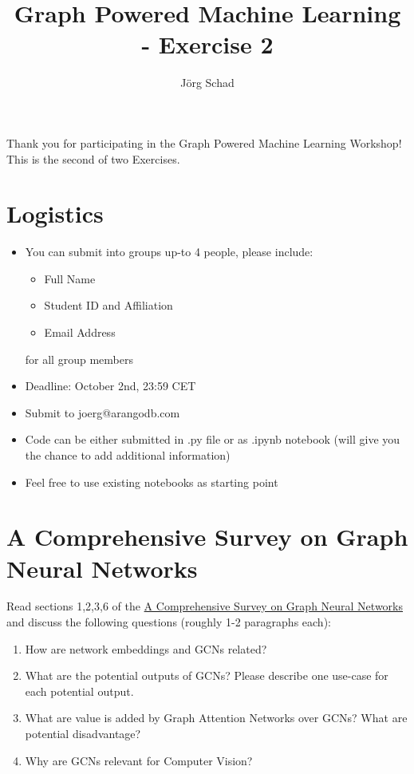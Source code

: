 \documentclass[12pt,a4paper]{article}
\title{Graph Powered Machine Learning - Exercise 2}
\author{J{\"o}rg Schad}
\begin{document}
\maketitle

Thank you for participating in the Graph Powered Machine Learning Workshop! This is the second of two Exercises.

\section*{Logistics}

\begin{itemize}
  \item You can submit into groups up-to 4 people, please include: 
  \begin{itemize}
  \item Full Name
  \item Student ID and Affiliation
  \item Email Address
  \end{itemize} for all group members
  \item Deadline: October 2nd, 23:59 CET
  \item Submit to joerg@arangodb.com
  \item Code can be either submitted in .py file or as .ipynb notebook (will give you the chance to add additional information)
  \item Feel free to use existing notebooks as starting point

\end{itemize}


\section{A Comprehensive Survey on Graph Neural
Networks}

Read sections 1,2,3,6 of the \href{https://arxiv.org/pdf/1901.00596v1.pdf}{A Comprehensive Survey on Graph Neural
Networks} and discuss the following questions (roughly 1-2 paragraphs each):
\begin{enumerate}
    \item How are network embeddings and GCNs related?
    \item What are the potential outputs of GCNs? Please describe one use-case for each potential output. 
    \item What are value is added by Graph Attention Networks over GCNs? What are potential disadvantage? 
    \item Why are GCNs relevant for Computer Vision?
\end{enumerate}
\end{document}
